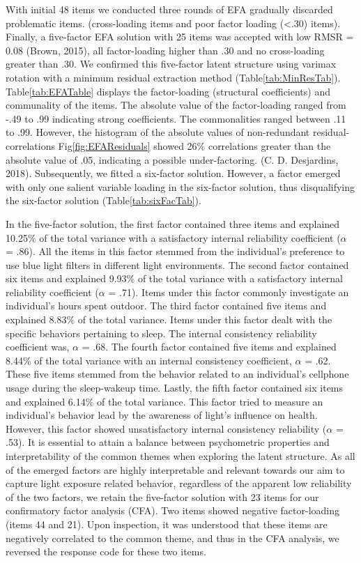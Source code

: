 \documentclass[
  english,
  man]{apa6}
\begin{document}
With initial 48 items we conducted three rounds of EFA gradually discarded problematic items. (cross-loading items and poor factor loading (\textless.30) items). Finally, a five-factor EFA solution with 25 items was accepted with low RMSR = 0.08 (Brown, 2015), all factor-loading higher than .30 and no cross-loading greater than .30. We confirmed this five-factor latent structure using varimax rotation with a minimum residual extraction method (Table\ref{tab:MinResTab}). Table\ref{tab:EFATable} displays the factor-loading (structural coefficients) and communality of the items. The absolute value of the factor-loading ranged from -.49 to .99 indicating strong coefficients. The commonalities ranged between .11 to .99. However, the histogram of the absolute values of non-redundant residual-correlations Fig\ref{fig:EFAResiduals} showed 26\% correlations greater than the absolute value of .05, indicating a possible under-factoring. (C. D. Desjardins, 2018). Subsequently, we fitted a six-factor solution. However, a factor emerged with only one salient variable loading in the six-factor solution, thus disqualifying the six-factor solution (Table\ref{tab:sixFacTab}).

In the five-factor solution, the first factor contained three items and explained 10.25\% of the total variance with a satisfactory internal reliability coefficient (\(\alpha\) = .86). All the items in this factor stemmed from the individual's preference to use blue light filters in different light environments. The second factor contained six items and explained 9.93\% of the total variance with a satisfactory internal reliability coefficient (\(\alpha\) = .71). Items under this factor commonly investigate an individual's hours spent outdoor. The third factor contained five items and explained 8.83\% of the total variance. Items under this factor dealt with the specific behaviors pertaining to sleep. The internal consistency reliability coefficient was, \(\alpha\) = .68. The fourth factor contained five items and explained 8.44\% of the total variance with an internal consistency coefficient, \(\alpha\) = .62. These five items stemmed from the behavior related to an individual's cellphone usage during the sleep-wakeup time. Lastly, the fifth factor contained six items and explained 6.14\% of the total variance. This factor tried to measure an individual's behavior lead by the awareness of light's influence on health. However, this factor showed unsatisfactory internal consistency reliability (\(\alpha\) = .53). It is essential to attain a balance between psychometric properties and interpretability of the common themes when exploring the latent structure. As all of the emerged factors are highly interpretable and relevant towards our aim to capture light exposure related behavior, regardless of the apparent low reliability of the two factors, we retain the five-factor solution with 23 items for our confirmatory factor analysis (CFA). Two items showed negative factor-loading (items 44 and 21). Upon inspection, it was understood that these items are negatively correlated to the common theme, and thus in the CFA analysis, we reversed the response code for these two items.
\end{document}
